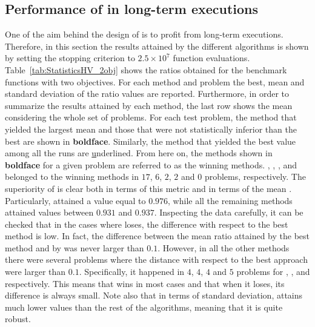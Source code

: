 \subsection{Performance of \MOEAS{} in long-term executions}


One of the aim behind the design of \AVSDMOEAD{} is to profit from long-term executions.
%
Therefore, in this section the results attained by the different algorithms is shown by setting 
the stopping criterion to $2.5 \times 10^7$ function evaluations.
%
Table~\ref{tab:StatisticsHV_2obj} shows the \HV{} ratios obtained for the benchmark functions with two objectives.
%
For each method and problem the best, mean and standard deviation of the \HV{} ratio values are reported.
%
Furthermore, in order to summarize the results attained by each method, the last row shows the mean considering the whole set 
of problems.
%
For each test problem, the method that yielded the largest mean and those that were not statistically inferior than the 
best are shown in \textbf{boldface}.
%
Similarly, the method that yielded the best \HV{} value among all the runs are {\ul underlined}.
%
From here on, the methods shown in {\bf boldface} for a given problem are referred to as the winning methods.
%
\AVSDMOEAD{}, \RMOEA{}, \MOEADDE{}, \NSGAIII{} and \NSGAII{} belonged to the winning methods in 
$17$, $6$, $2$, $2$ and $0$ problems, respectively.
%
The superiority of \AVSDMOEAD{} is clear both in terms of this metric and in terms of the mean \HV{}.
%
Particularly, \AVSDMOEAD{} attained a value equal to $0.976$, while all the remaining methods attained values between
$0.931$ and $0.937$.
%
Inspecting the data carefully, it can be checked that in the cases where \AVSDMOEAD{} loses, the difference with respect to the best 
method is low.
%
In fact, the difference between the mean \HV{} ratio attained by the best method and by \AVSDMOEAD{} was never larger than $0.1$.
%
However, in all the other methods there were several problems where the distance with respect to the best approach
were larger than $0.1$.
%
Specifically, it happened in $4$, $4$, $4$ and $5$ problems for \RMOEA{}, \MOEADDE{}, \NSGAII{} and \NSGAIII{} respectively.
%
This means that \AVSDMOEAD{} wins in most cases and that when it loses, its difference is always small.
%
Note also that in terms of standard deviation, \AVSDMOEAD{} attains much lower values than the rest of the algorithms, meaning that
it is quite robust.


